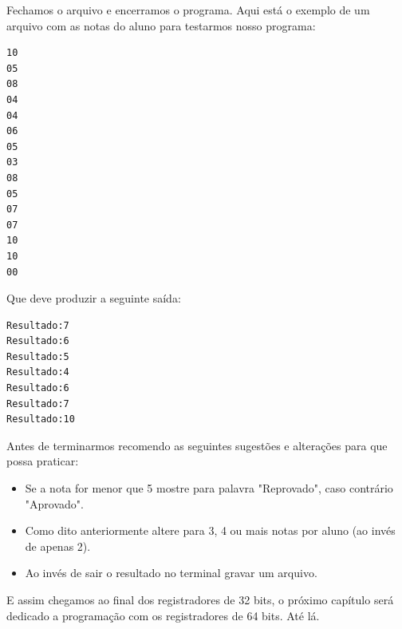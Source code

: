 Fechamos o arquivo e encerramos o programa. Aqui está o exemplo de um arquivo com as notas do aluno para testarmos nosso programa:
\begin{lstlisting}[]
10
05
08
04
04
06
05
03
08
05
07
07
10
10
00
\end{lstlisting}

Que deve produzir a seguinte saída:
\begin{lstlisting}[]
Resultado:7
Resultado:6
Resultado:5
Resultado:4
Resultado:6
Resultado:7
Resultado:10
\end{lstlisting}

Antes de terminarmos recomendo as seguintes sugestões e alterações para que possa praticar:
\begin{itemize}[nolistsep]
	\item Se a nota for menor que 5 mostre para palavra "Reprovado", caso contrário "Aprovado".
	\item Como dito anteriormente altere para 3, 4 ou mais notas por aluno (ao invés de apenas 2).
	\item Ao invés de sair o resultado no terminal gravar um arquivo.
\end{itemize}

E assim chegamos ao final dos registradores de 32 bits, o próximo capítulo será dedicado a programação com os registradores de 64 bits. Até lá.
\clearpage